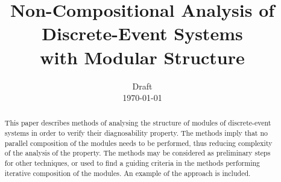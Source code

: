 \documentclass[a4paper, 10pt, conference]{ieeeconf} \IEEEoverridecommandlockouts
\begin{document}
\title{Non-Compositional Analysis of Discrete-Event Systems \\
with Modular Structure}
\author{Draft \\ \today}
\maketitle


\begin{abstract}
This paper describes methods of analysing the structure of modules of
discrete-event systems in order to verify their diagnosability property.
The methods imply that no parallel composition of the modules needs to be
performed, thus reducing complexity of the analysis of the property. The methods
may be considered as preliminary steps for other techniques, or used to find a
guiding criteria in the methods performing iterative composition of the modules.
An example of the approach is included.
\end{abstract}

\newtheorem{assumption}{Assumption}
\newtheorem{definition}{Definition}
\newtheorem{conjecture}{Conjecture}
\newtheorem{corollary}{Corollary}
\newtheorem{example}{Example}
\newtheorem{theorem}{Theorem}

\end{document}
